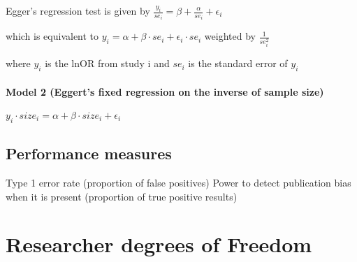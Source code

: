 \documentclass[english,doc,floatsintext]{apa6}
\begin{document}
Egger's regression test is given by
\(\frac{y_i}{se_i}= \beta + \frac{\alpha}{se_i}+\epsilon_i\)

which is equivalent to
\(y_i = \alpha +\beta \cdot se_i +\epsilon_i \cdot se_i\) weighted by \(\frac{1}{se_i^2}\)

where \(y_i\) is the lnOR from study i and \(se_i\) is the standard error of \(y_i\)

\hypertarget{model-2-eggerts-fixed-regression-on-the-inverse-of-sample-size}{%
\paragraph{Model 2 (Eggert's fixed regression on the inverse of sample size)}\label{model-2-eggerts-fixed-regression-on-the-inverse-of-sample-size}}

\(y_i \cdot size_i = \alpha +\beta \cdot size_i +\epsilon_i\)

\hypertarget{performance-measures}{%
\subsection{Performance measures}\label{performance-measures}}

Type 1 error rate (proportion of false positives)
Power to detect publication bias when it is present (proportion of true positive results)

\hypertarget{researcher-degrees-of-freedom}{%
\section{Researcher degrees of Freedom}\label{researcher-degrees-of-freedom}}
\end{document}
